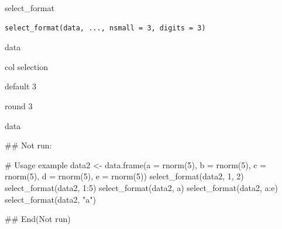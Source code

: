 \documentclass[a4paper]{book}
\begin{document}
%
\begin{Description}
select\_format
\end{Description}
%
\begin{Usage}
\begin{verbatim}
select_format(data, ..., nsmall = 3, digits = 3)
\end{verbatim}
\end{Usage}
%
\begin{Arguments}
\begin{ldescription}
\item[\code{data}] data

\item[\code{...}] col selection

\item[\code{nsmall}] default 3

\item[\code{digits}] round 3
\end{ldescription}
\end{Arguments}
%
\begin{Value}
data
\end{Value}
%
\begin{Examples}
\begin{ExampleCode}


\#\# Not run: 


# Usage example
data2 <- data.frame(a = rnorm(5), b = rnorm(5), c = rnorm(5), d = rnorm(5), e = rnorm(5))
select_format(data2, 1, 2)
select_format(data2, 1:5)
select_format(data2, a)
select_format(data2, a:e)
select_format(data2, "a")

## End(Not run)
\end{ExampleCode}
\end{Examples}
\end{document}
